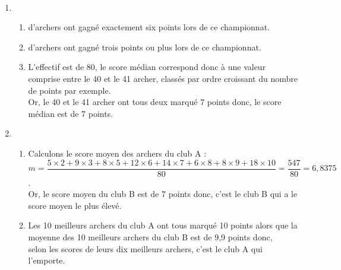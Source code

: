 \ \\ [-5mm]
   \begin{enumerate}
      \item
         \begin{enumerate}
            \item { d'archers} ont gagné exactement six points lors de ce championnat.
            \item { d'archers} ont gagné trois points ou plus lors de ce championnat.
            \item L'effectif est de 80, le score médian correspond donc à une valeur comprise entre le 40 et le 41 archer, classés par ordre croissant du nombre de points par exemple. \\
               Or, le 40 et le 41 archer ont tous deux marqué 7 points donc, {\blue le score médian est de 7 points.}
         \end{enumerate}
      \setcounter{enumi}{1}
      \item
         \begin{enumerate}
            \item Calculons le score moyen des archers du club A : \\ [1mm]
               $m =\dfrac{5\times2+9\times3+8\times5+12\times6+14\times7+6\times8+8\times9+18\times10}{80} =\dfrac{547}{80} =6,8375$. \\ [2mm]
               Or, le score moyen du club B est de 7 points donc, {\blue c'est le club B qui a le score moyen le plus élevé}.
            \item Les 10 meilleurs archers du club A ont tous marqué 10 points alors que la moyenne des 10 meilleurs archers du club B est de 9,9 points donc, \\
            {\blue selon les scores de leurs dix meilleurs archers, c'est le club A qui l'emporte}.
         \end{enumerate}
   \end{enumerate}
